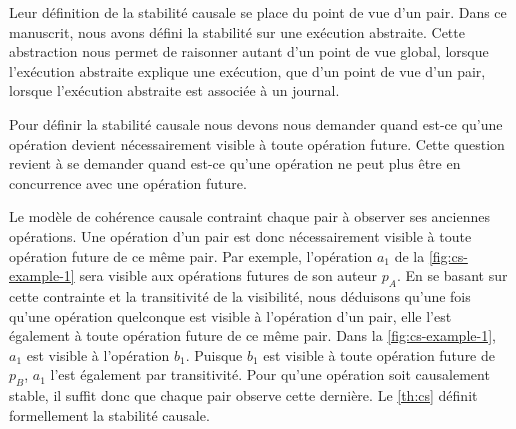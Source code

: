 Leur définition de la stabilité causale se place du point de vue d'un pair.
Dans ce manuscrit, nous avons défini la stabilité sur une exécution abstraite.
Cette abstraction nous permet de raisonner autant d'un point de vue global, lorsque l'exécution abstraite explique une exécution, que d'un point de vue d'un pair, lorsque l'exécution abstraite est associée à un journal.

Pour définir la stabilité causale nous devons nous demander quand est-ce qu'une opération devient nécessairement visible à toute opération future.
Cette question revient à se demander quand est-ce qu'une opération ne peut plus être en concurrence avec une opération future.

Le modèle de cohérence causale contraint chaque pair à observer ses anciennes opérations.
Une opération d'un pair est donc nécessairement visible à toute opération future de ce même pair.
Par exemple, l'opération $a_1$ de la \autoref{fig:cs-example-1} sera visible aux opérations futures de son auteur $p_A$.
En se basant sur cette contrainte et la transitivité de la visibilité, nous déduisons qu'une fois qu'une opération quelconque est visible à l'opération d'un pair, elle l'est également à toute opération future de ce même pair.
Dans la \autoref{fig:cs-example-1}, $a_1$ est visible à l'opération $b_1$.
Puisque $b_1$ est visible à toute opération future de $p_B$, $a_1$ l'est également par transitivité.
Pour qu'une opération soit causalement stable, il suffit donc que chaque pair observe cette dernière.
Le \autoref{th:cs} définit formellement la stabilité causale.

